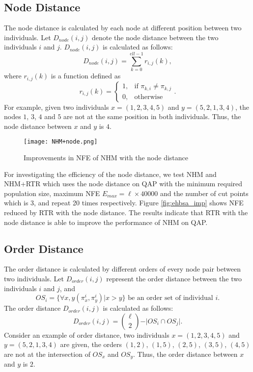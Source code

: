 \subsection*{Node Distance}
The node distance is calculated by each node at different position between two individuals. Let $D_{node} (i,j)$ denote the node distance between the two individuals $i$ and $j$. $D_{node} (i,j)$ is calculated as follows:\[D_{node} (i,j)=\sum_{k=0}^{ell-1} r_{i,j} (k), \]
where $r_{i,j} (k)$ is a function defined as \[r_{i,j} (k)=
\begin{cases}
1,  & \mbox{if }\pi_{k,i}\neq \pi_{k,j} \\
0, & \mbox{otherwise}
\end{cases}
.\] For example, given two individuals $x=(1,2,3,4,5)$ and $y=(5,2,1,3,4)$, the nodes $1$, $3$, $4$ and $5$ are not at the same position in both individuals. Thus, the node distance between $x$ and $y$ is $4$.



\begin{figure}[htbp] 
        \centering
        \texttt{[image: NHM+node.png]}
        \caption{ Improvements in NFE of NHM with the node distance } 
        \label{fig:nhbsa_imp}
\end{figure}


For investigating the efficiency of the node distance, we test NHM and NHM+RTR which uses the node distance on QAP with the minimum required population size, maximum NFE $E_{max} = \ell\times 40000$ and the number of cut points which is 3, and repeat 20 times respectively. Figure \ref{fig:ehbsa_imp} shows NFE reduced by RTR with the node distance. The results indicate that RTR with the node distance is able to improve the performance of NHM on QAP.



\subsection*{Order Distance}
The order distance is calculated by different orders of every node pair between two individuals. Let $D_{order} (i,j)$ represent the order distance between the two individuals $i$ and $j$, and \[OS_i=\lbrace\forall x,y(\pi_x^i,\pi_y^i)| x>y\rbrace\mbox{ be an order set of individual }i.\] The order distance $D_{order} (i,j)$ is calculated as follows:\[D_{order} (i,j)=\binom{\ell}{2}-\vert OS_i\cap OS_j\vert.\]
Consider an example of order distance, two individuals $x=(1,2,3,4,5)$ and $y=(5,2,1,3,4)$ are given, the orders $(1,2)$, $(1,5)$, $(2,5)$, $(3,5)$, $(4,5)$ are not at the intersection of $OS_x$ and $OS_y$. Thus, the order distance between $x$ and $y$ is $2$. 




